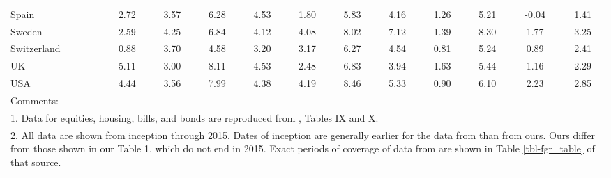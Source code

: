 \begin{table}
\begin{tabular}{lccccccccccc}
Spain & 2.72 & 3.57 & 6.28 & 4.53& 1.80& 5.83& 4.16& 1.26& 5.21& -0.04& 1.41\\
Sweden & 2.59 & 4.25 & 6.84 & 4.12& 4.08& 8.02& 7.12& 1.39& 8.30& 1.77& 3.25\\
Switzerland & 0.88 & 3.70 & 4.58 & 3.20& 3.17& 6.27& 4.54& 0.81& 5.24& 0.89& 2.41\\
UK & 5.11 & 3.00 & 8.11 & 4.53& 2.48& 6.83& 3.94& 1.63& 5.44& 1.16& 2.29\\
USA & 4.44 & 3.56 & 7.99 & 4.38& 4.19& 8.46& 5.33& 0.90& 6.10& 2.23& 2.85\\
\bottomrule
\multicolumn{12}{l}{\footnotesize Comments:}\\
\multicolumn{12}{l}{\footnotesize 1. Data for equities, housing, bills, and bonds are reproduced from \cite{jorda2019}, Tables IX and X.}\\
\multicolumn{12}{p{\dimexpr \textwidth-2\tabcolsep}}{\footnotesize 2. All data are shown from inception through 2015. Dates of inception are generally earlier for the data from \citeauthor{jorda2019} than from ours. Ours differ from those shown in our Table 1, which do not end in 2015. Exact periods of coverage of data from \cite{jorda2019} are shown in Table \ref{tbl-fgr_table} of that source.}
\end{tabular}
\label{tbl-jorda_table}
\end{table}
